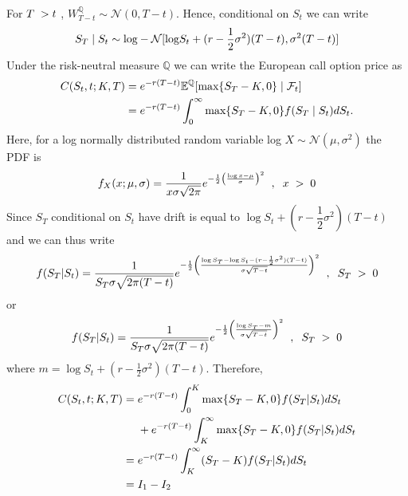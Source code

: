 For $T\hspace{0.1cm}>t\hspace{0.1cm}$, $W_{T-t}^\mathbb{Q} \sim \mathcal{N}(0, T-t)$. Hence, conditional on $S_t$ we can write
\begin{align*}
	S_T \mid S_t\sim \textnormal{log}-\mathcal{N}[\textnormal{log}S_t+(r-\dfrac{1}{2}\sigma^2)(T-t),\sigma^2(T-t)]
\end{align*}
Under the risk-neutral measure $\mathbb{Q}$ we can write the European call option price as
\begin{align*}
C(S_t,t;K,T) &= e^{-r(T-t)}\mathbb{E}^\mathbb{Q}[\textnormal{max}\{S_T-K,0\}\mid\mathcal{F}_t]\\
			&=e^{-r(T-t)} \displaystyle \int_{0}^{\infty}\textnormal{max}\{S_T-K,0\}f(S_T\mid S_t)dS_t.
\end{align*}
Here, for a log normally distributed random variable log $X\sim \mathcal{N}(\mu, \sigma^2)$ the PDF is
\begin{align*}
f_X(x; \mu, \sigma)=\dfrac{1}{x\sigma\sqrt{2\pi}}e^{-\frac{1}{2}\left(\frac{\log x-\mu}{\sigma}\right)^2} \hspace{0.2cm},\hspace{0.2cm} x\hspace{0.1cm} > \hspace{0.1cm}0
\end{align*}
Since $S_T$ conditional on $S_t$ have drift is equal to $\log S_t+(r-\dfrac{1}{2}\sigma^2)(T-t)$  
and we can thus write
\begin{align*}
f(S_T | S_t)=\dfrac{1}{S_T\sigma\sqrt{2\pi(T-t)}}e^{-\frac{1}{2}\left(\frac{\log S_T-\log S_t-(r-\frac{1}{2}\sigma^2)(T-t)}{\sigma\sqrt{T-t}}\right)^2} \hspace{0.2cm},\hspace{0.2cm} S_T\hspace{0.1cm} > \hspace{0.1cm}0
\end{align*}
or
\begin{align*}
f(S_T| S_t)=\dfrac{1}{S_T\sigma\sqrt{2\pi(T-t)}}e^{-\frac{1}{2}\left(\frac{\log S_T-m}{\sigma\sqrt{T-t}}\right)^2} \hspace{0.2cm},\hspace{0.2cm} S_T\hspace{0.1cm} > \hspace{0.1cm}0
\end{align*}
where $m=\log S_t+(r-\frac{1}{2}\sigma^2)(T-t)$. Therefore,
\begin{align*}
C(S_t,t;K,T) =\hspace{0.1cm} &e^{-r(T-t)} \displaystyle \int_{0}^{K}\max\{S_T-K,0\}f(S_T| S_t)dS_t \\ 		       &+e^{-r(T-t)} \displaystyle \int_{K}^{\infty}\max\{S_T-K,0\}f(S_T| S_t)dS_t\\
			  =\hspace{0.1cm} &e^{-r(T-t)} \displaystyle \int_{K}^{\infty}(S_T-K)f(S_T| S_t)dS_t\\
			  =\hspace{0.1cm} &I_1-I_2
\end{align*}
